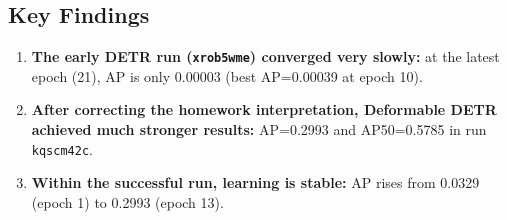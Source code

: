 \subsection{Key Findings}
\begin{enumerate}
    \item \textbf{The early DETR run (\texttt{xrob5wme}) converged very slowly:} at the latest epoch (21), AP is only 0.00003 (best AP=0.00039 at epoch 10).
    \item \textbf{After correcting the homework interpretation, Deformable DETR achieved much stronger results:} AP=0.2993 and AP50=0.5785 in run \texttt{kqscm42c}.
    \item \textbf{Within the successful run, learning is stable:} AP rises from 0.0329 (epoch 1) to 0.2993 (epoch 13).
\end{enumerate}
